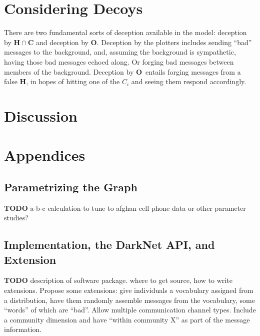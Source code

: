 \documentclass{article}
\newcommand{\Hub}[0]{\ensuremath{\mathbf{H}}}
\newcommand{\Obs}[0]{\ensuremath{\mathbf{O}}}
\begin{document}
\section*{Considering Decoys}
There are two fundamental sorts of deception available in the model: deception by $\Hub\cap\mathbf{C}$ and deception by \Obs.  Deception by the plotters includes sending ``bad'' messages to the background, and, assuming the background is sympathetic, having those bad messages echoed along. Or forging bad messages between members of the background.  Deception by \Obs\ entails forging messages from a false \Hub, in hopes of hitting one of the $C_i$ and seeing them respond accordingly.

\section*{Discussion}

\section*{Appendices}

\subsection*{Parametrizing the Graph}
{\bf TODO} a-b-c calculation to tune to afghan cell phone data or other parameter studies?

\subsection*{Implementation, the DarkNet API, and Extension}
{\bf TODO} description of software package.  where to get source, how to write extensions.  Propose some extensions: give individuals a vocabulary assigned from a distribution, have them randomly assemble messages from the vocabulary, some ``words'' of which are ``bad''.  Allow multiple communication channel types.  Include a community dimension and have ``within community X'' as part of the message information.


\newpage


\end{document}
